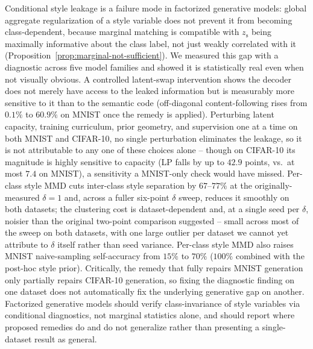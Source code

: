 \documentclass[10pt,letterpaper]{article}
\newcommand{\zs}{z_{\mathrm{s}}}
\begin{document}
Conditional style leakage is a failure mode in factorized generative
models: global aggregate regularization of a style variable does not
prevent it from becoming class-dependent, because marginal matching is
compatible with $\zs$ being maximally informative about the class label,
not just weakly correlated with it (Proposition~\ref{prop:marginal-not-sufficient}).
We measured this gap with a diagnostic across five model families and
showed it is statistically real even when not visually obvious. A
controlled latent-swap intervention shows the decoder does not merely have access
to the leaked information but is measurably more sensitive to it than to the
semantic code (off-diagonal content-following rises from $0.1\%$ to $60.9\%$
on MNIST once the remedy is applied). Perturbing latent capacity, training
curriculum, prior geometry, and supervision one at a time on both MNIST and
CIFAR-10, no single perturbation eliminates the leakage, so it is not
attributable to any one of these choices alone -- though on CIFAR-10 its
magnitude is highly sensitive to capacity (LP falls by up to $42.9$ points,
vs.\ at most $7.4$ on MNIST), a sensitivity a MNIST-only check would have
missed. Per-class style MMD cuts inter-class style separation by
$67$--$77\%$ at the originally-measured $\delta{=}1$ and, across a fuller
six-point $\delta$ sweep, reduces it smoothly on both datasets; the
clustering cost is dataset-dependent and, at a single seed per $\delta$,
noisier than the original two-point comparison suggested -- small across
most of the sweep on both datasets, with one large outlier per dataset we
cannot yet attribute to $\delta$ itself rather than seed variance. Per-class
style MMD also raises MNIST naive-sampling self-accuracy from $15\%$ to
$70\%$ ($100\%$ combined with the post-hoc style prior). Critically, the remedy
that fully repairs MNIST generation only partially repairs CIFAR-10
generation, so fixing the diagnostic finding on one dataset does not
automatically fix the underlying generative gap on another. Factorized
generative models should verify class-invariance of style variables via
conditional diagnostics, not marginal statistics alone, and should report
where proposed remedies do and do not generalize rather than presenting a
single-dataset result as general.




\appendix
\end{document}
